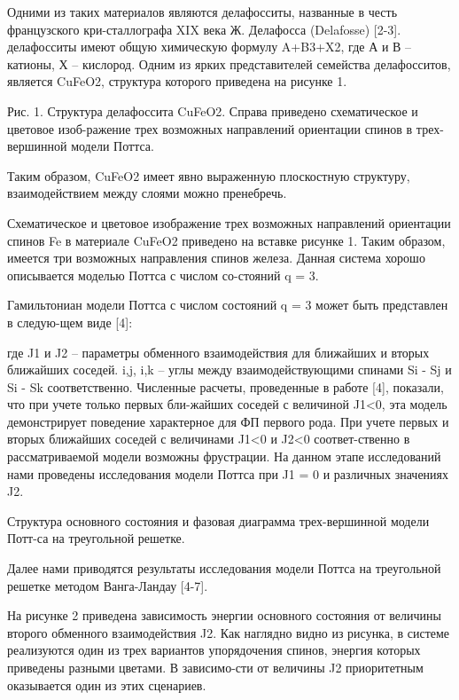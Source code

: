 Одними из таких материалов являются делафосситы, названные в честь французского кри-сталлографа XIX века Ж. Делафосса  (Delafosse) [2-3]. делафосситы имеют общую химическую формулу A+B3+X2, где А и В – катионы, Х – кислород. Одним из ярких представителей семейства делафосситов, является CuFeO2, структура которого приведена на рисунке 1.



Рис. 1. Структура делафоссита CuFeO2. Справа приведено схематическое и цветовое изоб-ражение трех возможных направлений ориентации спинов в трех-вершинной  модели Поттса.





Таким образом, CuFeO2  имеет явно выраженную плоскостную структуру, взаимодействием между слоями можно пренебречь.

Схематическое и цветовое изображение трех возможных направлений ориентации спинов  Fe  в материале CuFeO2 приведено на вставке рисунке 1. Таким образом, имеется три возможных направления спинов железа. Данная система хорошо описывается моделью Поттса с числом со-стояний q = 3.

Гамильтониан модели Поттса с числом состояний q = 3 может быть представлен в следую-щем виде [4]:


где J1 и J2 – параметры обменного взаимодействия для ближайших и вторых ближайших соседей. i,j, i,k – углы между взаимодействующими спинами Si - Sj и Si - Sk соответственно.
Численные расчеты, проведенные в работе [4], показали, что при учете только первых бли-жайших соседей с величиной J1<0, эта модель демонстрирует поведение характерное для ФП первого рода. При учете первых и вторых ближайших соседей с величинами J1<0 и J2<0 соответ-ственно в рассматриваемой модели возможны фрустрации. На данном этапе исследований нами проведены исследования модели Поттса при J1 = 0 и различных значениях J2.




Структура основного состояния и фазовая диаграмма трех-вершинной модели Потт-са на треугольной решетке.

Далее нами приводятся результаты исследования модели Поттса на треугольной решетке методом Ванга-Ландау [4-7].

На рисунке 2 приведена зависимость энергии основного состояния от величины второго обменного взаимодействия J2. Как наглядно видно из рисунка, в системе реализуются один из трех вариантов упорядочения спинов, энергия которых приведены разными цветами. В зависимо-сти от величины J2 приоритетным оказывается один из этих сценариев.



